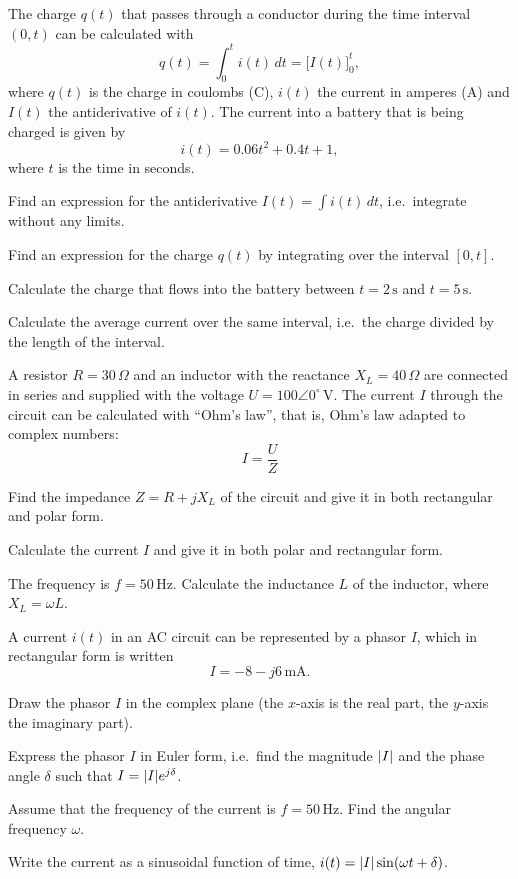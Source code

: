 The charge $q(t)$ that passes through a conductor during the time interval $(0, t)$ can be
calculated with
\[
  q(t) = \int_0^t i(t)\,dt = \bigl[I(t)\bigr]_0^t,
\]
where $q(t)$ is the charge in coulombs (C), $i(t)$ the current in amperes (A) and $I(t)$ the
antiderivative of $i(t)$. The current into a battery that is being charged is given by
\[
  i(t) = 0.06t^2 + 0.4t + 1,
\]
where $t$ is the time in seconds.
\begin{parts}
  \item Find an expression for the antiderivative $I(t) = \int i(t)\,dt$, i.e.\ integrate
    without any limits.
  \item Find an expression for the charge $q(t)$ by integrating over the interval $[0, t]$.
  \item Calculate the charge that flows into the battery between $t = 2\,\text{s}$ and
    $t = 5\,\text{s}$.
  \item Calculate the average current over the same interval, i.e.\ the charge divided by the
    length of the interval.
\end{parts}

A resistor $R = 30\,\Omega$ and an inductor with the reactance $X_L = 40\,\Omega$ are connected
in series and supplied with the voltage $U = 100\angle 0^{\circ}\,\text{V}$. The current $I$
through the circuit can be calculated with “Ohm's law”, that is, Ohm's law adapted to complex
numbers:
\[
  I = \frac{U}{Z}
\]
\begin{parts}
  \item Find the impedance $Z = R + jX_L$ of the circuit and give it in both rectangular and polar
    form.
  \item Calculate the current $I$ and give it in both polar and rectangular form.
  \item The frequency is $f = 50\,\text{Hz}$. Calculate the inductance $L$ of the inductor, where
    $X_L = \omega L$.
\end{parts}

A current $i(t)$ in an AC circuit can be represented by a phasor $I$, which in rectangular form is
written
\[
  I = -8 - j6\,\text{mA}.
\]
\begin{parts}
  \item Draw the phasor $I$ in the complex plane (the $x$-axis is the real part, the $y$-axis the
    imaginary part).
  \item Express the phasor $I$ in Euler form, i.e.\ find the magnitude $\lvert I\rvert$ and the phase
    angle $\delta$ such that $I = \lvert I\rvert e^{j\delta}$.
  \item Assume that the frequency of the current is $f = 50\,\text{Hz}$. Find the angular
    frequency $\omega$.
  \item Write the current as a sinusoidal function of time, $i(t) = \lvert I\rvert\sin(\omega t + \delta)$.
\end{parts}

